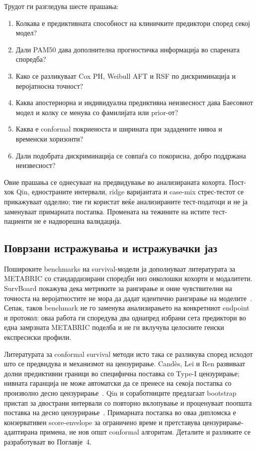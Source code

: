\documentclass[12pt]{article}
\begin{document}
Трудот ги разгледува шесте прашања:
\begin{enumerate}
    \item Колкава е предиктивната способност на клиничките предиктори според секој модел?
    \item Дали PAM50 дава дополнителна прогностичка информација во спарената споредба?
    \item Како се разликуваат Cox PH, Weibull AFT и RSF по дискриминација и веројатносна точност?
    \item Каква апостериорна и индивидуална предиктивна неизвесност дава Баесовиот модел и колку се менува со фамилијата или prior-от?
    \item Каква е conformal покриеноста и ширината при зададените нивоа и временски хоризонти?
    \item Дали подобрата дискриминација се совпаѓа со покорисна, добро поддржана неизвесност?
\end{enumerate}

Овие прашања се однесуваат на предвидување во анализираната кохорта. Пост-хок Qin, едностраните интервали, ridge варијантата и case-mix стрес-тестот се прикажуваат одделно; тие ги користат веќе анализираните тест-податоци и не ја заменуваат примарната постапка. Промената на тежините на истите тест-пациенти не е надворешна валидација.

\subsection{Поврзани истражувања и истражувачки јаз}

Пошироките benchmarks на survival-модели ја дополнуваат литературата за METABRIC со стандардизирани споредби низ онколошки кохорти и модалитети. SurvBoard покажува дека метриките за рангирање и оние чувствителни на точноста на веројатностите не мора да дадат идентично рангирање на моделите~\cite{wissel2025}. Сепак, таков benchmark не го заменува анализирањето на конкретниот endpoint и протокол: оваа работа ги споредува два однапред избрани сета предиктори во една замрзната METABRIC поделба и не ги вклучува целосните генски експресиски профили.

Литературата за conformal survival методи исто така се разликува според исходот што се предвидува и механизмот на цензурирање. Candès, Lei и Ren развиваат долни предиктивни граници во специфична поставка со Type-I цензурирање; нивната гаранција не може автоматски да се пренесе на секоја постапка со произволно десно цензурирање~\cite{candes2023}. Qin и соработниците предлагаат bootstrap пристап за двострани интервали со повторно вклопување и проценуваат поопшта поставка на десно цензурирање~\cite{qin2025}. Примарната постапка во оваа дипломска е конзервативен score-envelope за ограничено време и претставува цензурирање-адаптирана примена, не нов општ conformal алгоритам. Деталите и разликите се разработуваат во Поглавје~4.
\end{document}
